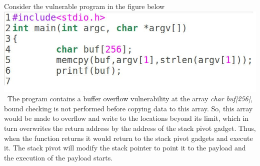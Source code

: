 \documentclass{article}
\begin{document}
\begin{multicols}{2}
	Consider the vulnerable program in the figure below
	\
	\includegraphics[scale=.27]{vul_prog.jpg}
	\
	The program contains a buffer overflow vulnerability at the array \textit{char buf[256]}, bound checking is not performed before copying data to this array. So, this array would be made to overflow and write to the locations beyond its limit, which in turn overwrites the return address by the address of the stack pivot gadget. Thus, when the function returns it would return to the stack pivot gadgets and execute it. The stack pivot will modify the stack pointer to point it to the payload and the execution of the payload starts.
	

\end{multicols}
\end{document}
